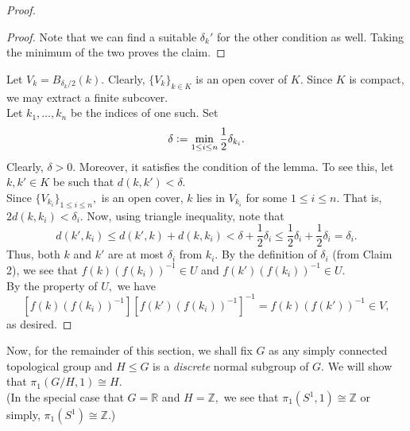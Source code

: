 \documentclass[12pt]{article}
\theoremstyle{definition}
\numberwithin{thm}{section}
\newenvironment{blockquote}
{\begin{mdframed}[skipabove=0pt, skipbelow=0pt, innertopmargin=4pt, innerbottommargin=4pt, bottomline=false,topline=false,rightline=false, linewidth=2pt]}
{\end{mdframed}}
\begin{document}
\begin{proof}
\begin{blockquote}
\begin{proof}
			Note that we can find a suitable $\delta_k'$ for the other condition as well. Taking the minimum of the two proves the claim.
		\end{proof}
	\end{blockquote}
	Let $V_k = B_{\delta_k/2}(k).$ Clearly, $\{V_k\}_{k \in K}$ is an open cover of $K.$ Since $K$ is compact, we may extract a finite subcover.\\
	Let $k_1, \ldots, k_n$ be the indices of one such. Set 
	\begin{equation*} 
		\delta \vcentcolon= \min_{1 \le i \le n} \dfrac{1}{2}\delta_{k_i}.
	\end{equation*}
	Clearly, $\delta > 0.$ Moreover, it satisfies the condition of the lemma. To see this, let $k, k' \in K$ be such that $d(k, k') < \delta.$\\
	Since $\{V_{k_i}\}_{1 \le i \le n},$ is an open cover, $k$ lies in $V_{k_i}$ for some $1 \le i \le n.$ That is, $2d(k, k_i) < \delta_i.$ Now, using triangle inequality, note that
	\begin{equation*} 
		d(k', k_i) \le d(k', k) + d(k, k_i) < \delta + \frac{1}{2}\delta_i \le \dfrac{1}{2}\delta_i + \dfrac{1}{2}\delta_i = \delta_i.
	\end{equation*}
	Thus, both $k$ and $k'$ are at most $\delta_i$ from $k_i.$ By the definition of $\delta_i$ (from Claim 2), we see that $f(k)(f(k_i))^{-1} \in U$ and $f(k')(f(k_i))^{-1} \in U.$\\
	By the property of $U,$ we have
	\begin{equation*} 
		\left[f(k)(f(k_i))^{-1}\right]\left[f(k')(f(k_i))^{-1}\right]^{-1} = f(k)(f(k'))^{-1} \in V,
	\end{equation*}
	as desired.
\end{proof}

Now, for the remainder of this section, we shall fix $G$ as any simply connected topological group and $H \le G$ is a \emph{discrete} normal subgroup of $G.$ We will show that $\pi_1(G/H, 1) \cong H.$\\
(In the special case that $G = \mathbb{R}$ and $H = \mathbb{Z},$ we see that $\pi_1(S^1, 1) \cong \mathbb{Z}$ or simply, $\pi_1(S^1) \cong \mathbb{Z}.$)
\end{document}
